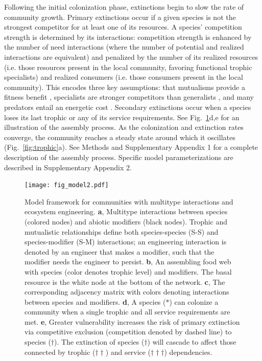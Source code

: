 \documentclass[twocolumn,preprintnumbers,amsmath,amssymb,superscriptaddress,linenumbers]{revtex4-1}
\begin{document}
Following the initial colonization phase, extinctions begin to slow the rate of community growth.
Primary extinctions occur if a given species is not the strongest competitor for at least one of its resources.
A species' competition strength is determined by its interactions: competition strength is enhanced by the number of need interactions (where the number of potential and realized interactions are equivalent) and penalized by the number of its realized resources (i.e. those resources present in the local community, favoring functional trophic specialists) and realized consumers (i.e. those consumers present in the local community).
This encodes three key assumptions: that mutualisms provide a fitness benefit \cite{Bronstein1994}, specialists are stronger competitors than generalists \cite{Macarthur1964,Dykhuizen1980,Futuyma1988,Costa2015}, and many predators entail an energetic cost \cite{Brown1994}.
Secondary extinctions occur when a species loses its last trophic or any of its service requirements.
See Fig.\ \ref{fig:model}d,e for an illustration of the assembly process. 
As the colonization and extinction rates converge, the community reaches a steady state around which it oscillates (Fig.\ \ref{fig:trophic}a).
See Methods and Supplementary Appendix 1 for a complete description of the assembly process.
Specific model parameterizations are described in Supplementary Appendix 2. %


\begin{figure}[h!]
\centering
\texttt{[image: fig\_model2.pdf]}
\vspace{0mm}
\caption{
Model framework for communities with multitype interactions and ecosystem engineering.
\textbf{a}, Multitype interactions between species (colored nodes) and abiotic modifiers (black nodes).
Trophic and mutualistic relationships define both species-species (S-S) and species-modifier (S-M) interactions; an engineering interaction is denoted by an engineer that makes a modifier, such that the modifier needs the engineer to persist.
\textbf{b}, An assembling food web with species (color denotes trophic level) and modifiers. The basal resource is the white node at the bottom of the network.
\textbf{c}, The corresponding adjacency matrix with colors denoting interactions between species and modifiers.
\textbf{d}, A species ($\ast$) can colonize a community when a single trophic and all service requirements are met.
\textbf{e}, Greater vulnerability increases the risk of primary extinction via competitive exclusion (competition denoted by dashed line) to species ($\dag$).
The extinction of species ($\dag$) will cascade to affect those connected by trophic ($\dag \dag$) and service ($\dag \dag \dag$) dependencies. 
\vspace{-3mm}
}
\vspace{0mm}
\label{fig:model}
\end{figure}
\end{document}

